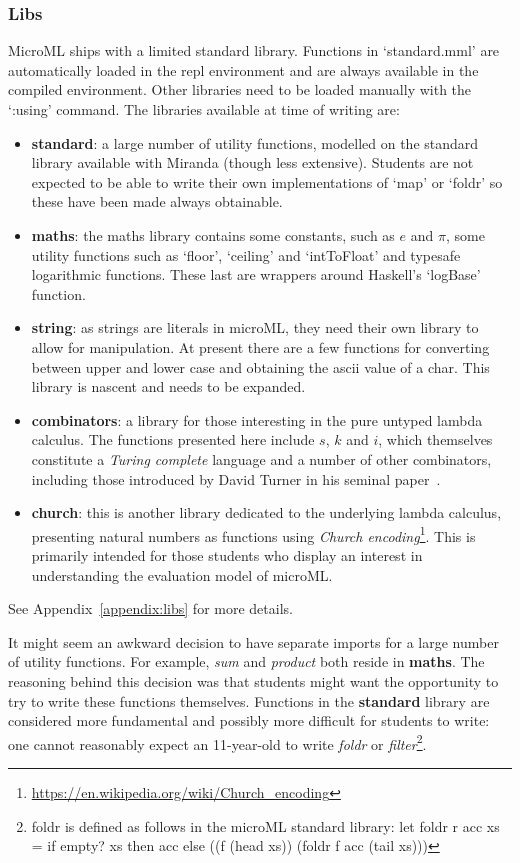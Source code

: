 \documentclass[12pt, a4paper]{report}
\begin{document}
\subsubsection{Libs}
\label{libs}
MicroML ships with a limited standard library. Functions in `standard.mml' are automatically loaded
in the repl environment and are always available in the compiled environment. Other libraries need
to be loaded manually with the `:using' command. The libraries available at time of writing are:

\begin{itemize}
    \item \textbf{standard}: a large number of utility functions, modelled on the standard library available
        with Miranda (though less extensive). Students are not expected to be able to write their
        own implementations of `map' or `foldr' so these have been made always obtainable.
    \item \textbf{maths}: the maths library contains some constants, such as $e$ and $\pi$, some utility
        functions such as `floor', `ceiling' and `intToFloat' and typesafe logarithmic functions.
        These last are wrappers around Haskell's `logBase' function.
    \item \textbf{string}: as strings are literals in microML, they need their own library to allow for
        manipulation. At present there are a few functions for converting between upper and lower
        case and obtaining the ascii value of a char. This library is nascent and needs to be
        expanded.
    \item \textbf{combinators}: a library for those interesting in the pure untyped lambda calculus. The
        functions presented here include $s$, $k$ and $i$, which themselves constitute a
        \textit{Turing complete} language and a number of other combinators, including those
        introduced by David Turner in his seminal paper~\cite{TUR79a}.
    \item \textbf{church}: this is another library dedicated to the underlying lambda calculus, presenting
        natural numbers as functions using \textit{Church encoding}\footnote{\url{https://en.wikipedia.org/wiki/Church_encoding}}.
        This is primarily intended for those students who display an interest in understanding the
        evaluation model of microML\@.
\end{itemize}

See Appendix~\ref{appendix:libs} for more details.

It might seem an awkward decision to have separate imports for a large number of utility functions.
For example, \textit{sum} and \textit{product} both reside in \textbf{maths}. The reasoning
behind this decision was that students might want the opportunity to try to write these functions
themselves. Functions in the \textbf{standard} library are considered more fundamental and possibly
more difficult for students to write: one cannot reasonably expect an 11-year-old to write
\textit{foldr} or \textit{filter}\footnote{foldr is defined as follows in the microML standard
library\@: let foldr r acc xs = if empty? xs then acc else ((f (head xs)) (foldr f acc (tail xs)))}.
\end{document}
